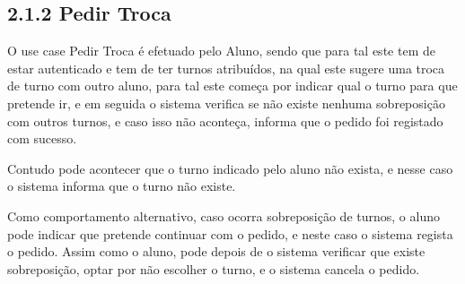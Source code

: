 \documentclass[12pt,a4paper]{report}
\begin{document}
\subsection{2.1.2 Pedir Troca}
O use case Pedir Troca é efetuado pelo Aluno, sendo que para tal este tem de estar
autenticado e tem de ter turnos atribuídos, na qual este sugere uma troca de turno com
outro aluno, para tal este começa por indicar qual o turno para que pretende ir, e em
seguida o sistema verifica se não existe nenhuma sobreposição com outros turnos, e caso
isso não aconteça, informa que o pedido foi registado com sucesso.

Contudo pode acontecer que o turno indicado pelo aluno não exista, e nesse caso o
sistema informa que o turno não existe.

Como comportamento alternativo, caso ocorra sobreposição de turnos, o aluno pode
indicar que pretende continuar com o pedido, e neste caso o sistema regista o pedido.
Assim como o aluno, pode depois de o sistema verificar que existe sobreposição, optar por
não escolher o turno, e o sistema cancela o pedido.
\end{document}
